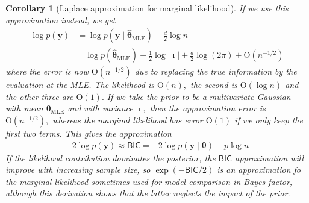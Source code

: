 \documentclass[
  11pt,
  letterpaper,
]{scrbook}
\theoremstyle{definition}
\theoremstyle{definition}
\theoremstyle{definition}
\theoremstyle{plain}
\theoremstyle{plain}
\theoremstyle{plain}
\newtheorem{corollary}{Corollary}[chapter]
\theoremstyle{remark}
\begin{document}
\begin{corollary}[Laplace approximation for marginal
likelihood]
If we use this approximation instead, we get \begin{align*}
 \log p(\boldsymbol{y}) &= \log p(\boldsymbol{y} \mid \widehat{\boldsymbol{\theta}}_{\mathrm{MLE}}) -\frac{d}{2} \log n + \\& \quad  \log p(\widehat{\boldsymbol{\theta}}_{\mathrm{MLE}}) - \frac{1}{2} \log |\boldsymbol{\imath}| + \frac{d}{2} \log(2\pi)  + \mathrm{O}(n^{-1/2})
\end{align*} where the error is now \(\mathrm{O}(n^{-1/2})\) due to
replacing the true information by the evaluation at the MLE. The
likelihood is \(\mathrm{O}(n),\) the second is \(\mathrm{O}(\log n)\)
and the other three are \(\mathrm{O}(1).\) If we take the prior to be a
multivariate Gaussian with mean \(\boldsymbol{\theta}_{\mathrm{MLE}}\)
and with variance \(\boldsymbol{\imath},\) then the approximation error
is \(\mathrm{O}(n^{-1/2}),\) whereas the marginal likelihood has error
\(\mathrm{O}(1)\) if we only keep the first two terms. This gives the
approximation \begin{align*}
-2\log p(\boldsymbol{y}) \approx \mathsf{BIC} = -2\log p(\boldsymbol{y} \mid \boldsymbol{\theta}) + p\log n
\end{align*} If the likelihood contribution dominates the posterior, the
\(\mathsf{BIC}\) approximation will improve with increasing sample size,
so \(\exp(-\mathsf{BIC}/2)\) is an approximation fo the marginal
likelihood sometimes used for model comparison in Bayes factor, although
this derivation shows that the latter neglects the impact of the prior.

\end{corollary}
\end{document}
